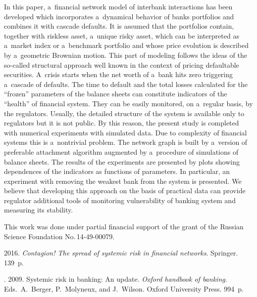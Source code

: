 \begin{multicols}{2}
\noindent
In this paper, a~financial network model of interbank interactions has been developed 
which incorporates a~dynamical behavior of banks portfolios and combines it with 
cascade defaults. It is assumed that the portfolios contain, 
together with riskless asset, a~unique risky asset, which can be interpreted as a~market index or a~benchmark portfolio and whose price evolution is described 
by a~geometric Brownian motion. This part of modeling follows the ideas of the 
so-called structural approach well known in the context of pricing defaultable 
securities. A~crisis starts  
when the net worth of a~bank hits zero triggering a~cascade of defaults. The 
time to default and the total losses calculated for the ``frozen'' parameters of 
the balance sheets  can constitute indicators of the ``health'' of financial 
system. They can be easily  monitored,  on a~regular basis, by the regulators. 
Usually, the detailed structure of the system is available only to regulators 
but it is  not public. By this reason,  the present study is completed with numerical 
experiments with 
simulated data. Due to complexity of financial systems this is a~nontrivial 
problem.  The network graph is built by a~version  of preferable attachment 
algorithm augmented by a~procedure of simulations of balance sheets.  The results of 
the experiments are presented by plots showing dependences of the indicators as 
functions   of parameters.    In particular, an experiment with 
removing the weakest  bank from the system is presented. We believe that developing 
this 
approach on the basis of practical data 
can provide regulator additional tools of monitoring vulnerability of banking 
system and measuring its stability. 
  

\Ack  
\noindent
This work was done 
under partial financial support   of the grant 
of  the Russian Science Foundation No.\,14-49-00079.

\renewcommand{\bibname}{\protect\rmfamily References}

\vspace*{-6pt}

{\small\frenchspacing
{%
\begin{thebibliography}{99}
2016. \textit{Contagion! The spread of systemic risk in financial networks}.  Springer.
139~p.

.  2009.
Systemic risk in banking: An update.  \textit{Oxford handbook of banking}.
Eds.\ A.~Berger, P.~Molyneux, and J.~Wilson. Oxford 
University Press. 994~p.


\end{thebibliography}}}
\end{multicols}
